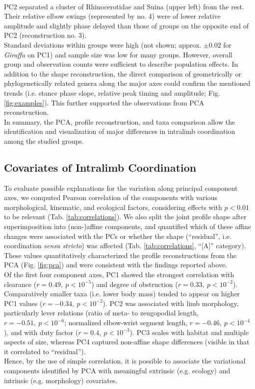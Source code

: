 \\PC2 separated a cluster of Rhinocerotidae and Suina (upper left) from the rest.
Their relative elbow swings (represented by no. 4) were of lower relative amplitude and slightly phase delayed than those of groups on the opposite end of PC2 (reconstruction no. 3).
\\Standard deviations within groups were high (not shown; approx. $\pm 0.02$ for \textit{Giraffa} on PC1) and sample size was low for many groups.
However, overall group and observation counts were sufficient to describe population effects.
In addition to the shape reconstruction, the direct comparison of geometrically or phylogenetically related genera along the major axes could confirm the mentioned trends (i.e. stance phase slope, relative peak timing and amplitude; Fig. \ref*{fig:examples}).
This further supported the observations from PCA reconstruction.
\\In summary, the PCA, profile reconstruction, and taxa comparison allow the identification and visualization of major differences in intralimb coordination among the studied groups.


\subsection{Covariates of Intralimb Coordination}
To evaluate possible explanations for the variation along principal component axes, we computed Pearson correlation of the components with various morphological, kinematic, and ecological factors, considering effects with $p<0.01$ to be relevant (Tab. \ref{tab:correlations}).
We also split the joint profile shape after superimposition into (non-)affine components, and quantified which of these affine changes were associated with the PCs or whether the shape (``residual'', i.e. coordination \textit{sensu stricto}) was affected (Tab. \ref{tab:correlations}, ``[A]'' category).
These values quantitatively characterized the profile reconstructions from the PCA (Fig. \ref{fig:pca}) and were consistent with the findings reported above.
\\Of the first four component axes, PC1 showed the strongest correlation with clearance ($r = 0.49,\ p < 10^{-5}$) and degree of obstruction ($r = 0.33,\ p < 10^{-2}$).
Comparatively smaller taxa (i.e. lower body mass) tended to appear on higher PC1 values ($r = -0.34,\ p < 10^{-2}$).
PC2 was associated with limb morphology, particularly lever relations (ratio of meta- to zeugopodial length, $r = -0.51,\ p < 10^{-6}$; normalized elbow-wrist segment length, $r = -0.46,\ p < 10^{-4}$), and with duty factor ($r = 0.4,\ p < 10^{-3}$).
PC3 scales with habitat and multiple aspects of size, whereas PC4 captured non-affine shape differences (visible in that it correlated to ``residual'').
\\Hence, by the use of simple correlation, it is possible to associate the variational components identified by PCA with meaningful extrinsic (e.g. ecology) and intrinsic (e.g. morphology) covariates.


